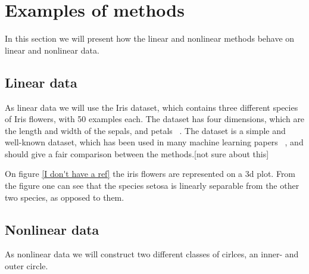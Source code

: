 \section{Examples of methods}
In this section we will present how the linear and nonlinear methods behave on linear and nonlinear data.




\subsection{Linear data}
As linear data we will use the Iris dataset, which contains three different species of Iris flowers, with 50 examples each. The dataset has four dimensions, which are the length and width of the sepals, and petals ~\cite{iris-dataset}. The dataset is a simple and well-known dataset, which has been used in many machine learning papers ~\cite{iris-dataset}, and should give a fair comparison between the methods.[not sure about this]


On figure \ref{I don't have a ref} the iris flowers are represented on a 3d plot. From the figure one can see that the species setosa is linearly separable from the other two species, as opposed to them.





\subsection{Nonlinear data}
As nonlinear data we will construct two different classes of cirlces, an inner- and outer circle.

